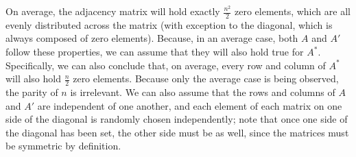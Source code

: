 \documentclass[12pt]{article}
\begin{document}
On average, the adjacency matrix will hold exactly $\frac{n^2}{2}$ zero elements, which are all evenly distributed across the matrix (with exception to the diagonal, which is always composed of zero elements). Because, in an average case, both $A$ and $A'$ follow these properties, we can assume that they will also hold true for $A^*$. Specifically, we can also conclude that, on average, every row and column of $A^*$ will also hold $\frac{n}{2}$ zero elements. Because only the average case is being observed, the parity of $n$ is irrelevant. We can also assume that the rows and columns of $A$ and $A'$ are independent of one another, and each element of each matrix on one side of the diagonal is randomly chosen independently; note that once one side of the diagonal has been set, the other side must be as well, since the matrices must be symmetric by definition.
\end{document}
